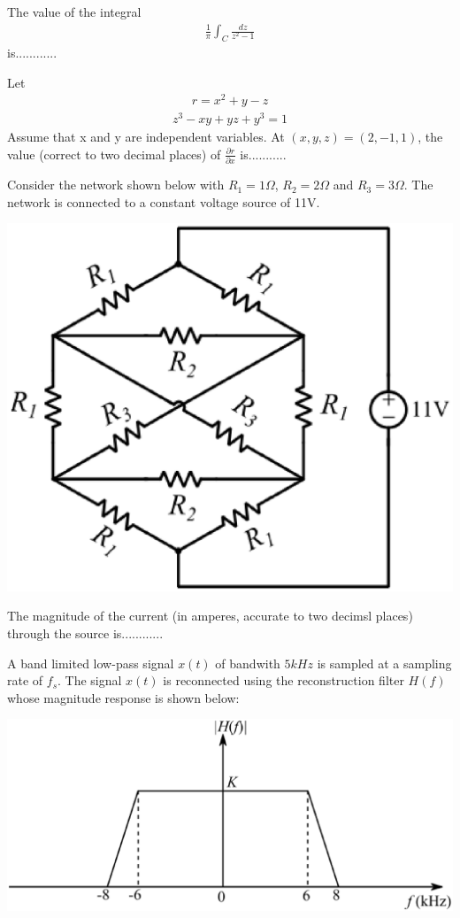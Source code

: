 The value of the integral
\begin{align*}
\frac{1}{\pi} \int_{C}\frac{dz}{z^2 - 1}
\end{align*}
is............

\item Let 
\begin{align*}
r = x^2 + y - z
\end{align*}
\begin{align*}
z^3 - xy + yz + y^3 = 1
\end{align*}
Assume that x and y are independent variables. At $(x, y, z) = (2, -1, 1)$, the value (correct to two decimal places) of 
$\frac{\partial r}{\partial x}$ is...........

\item Consider the network shown below with $R_1 = 1\Omega$, $R_2 = 2\Omega$ and $R_3 = 3\Omega$. The network is connected to a constant voltage source of 11V.

\includegraphics[scale=0.4]{63}

The magnitude of the current (in amperes, accurate to two decimsl places) through the source is............

\item A band limited low-pass signal $x(t)$ of bandwith $5kHz$ is sampled at a sampling rate of $f_s$. The signal $x(t)$ is reconnected using the reconstruction filter $H(f)$ whose magnitude response is shown below:

\includegraphics[scale=0.27]{64}

